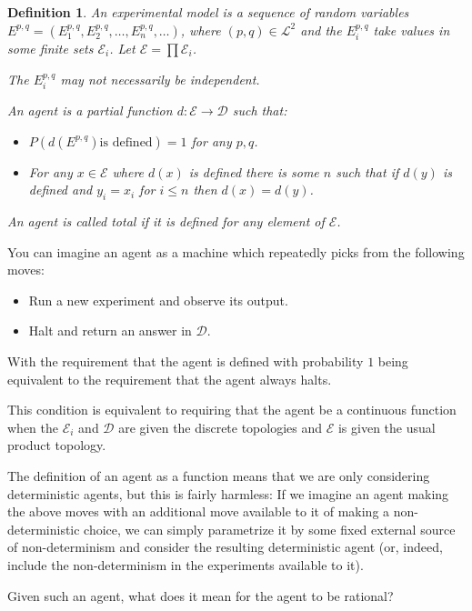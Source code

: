 \documentclass[a4paper]{book}
\newtheorem{definition}{Definition}[section]
\begin{document}
\begin{definition}
An experimental model is a sequence of random variables 
$E^{p, q} = (E^{p, q}_1, E^{p, q}_2, \ldots, E^{p, q}_n, \ldots)$, where
$(p, q) \in \mathcal{L}^2$ and the $E^{p, q}_i$ take values in some finite
sets $\mathcal{E}_i$. Let $\mathcal{E} = \prod \mathcal{E}_i$.

The $E^{p, q}_i$ may not necessarily be independent.

An agent is a partial function
$d: \mathcal{E} \to \mathcal{D}$ such that:

\begin{itemize}
\item $P(d(E^{p, q}) \text{is defined}) = 1$ for any $p, q$.
\item For any $x \in \mathcal{E}$ where $d(x)$ is defined
there is some $n$ such that if $d(y)$ is defined and $y_i = x_i$
for $i \leq n$ then $d(x) = d(y)$.
\end{itemize}

An agent is called total if it is defined for any element of $\mathcal{E}$.
\end{definition}

You can imagine an agent as a machine which repeatedly picks from the
following moves:

\begin{itemize}
\item Run a new experiment and observe its output.
\item Halt and return an answer in $\mathcal{D}$.
\end{itemize}

With the requirement that the agent is defined with probability $1$ being
equivalent to the requirement that the agent always halts.

This condition is equivalent to requiring that the agent be a continuous
function when the $\mathcal{E}_i$
and $\mathcal{D}$
are given the discrete topologies and $\mathcal{E}$
is given the usual product topology.

The definition of an agent as a function means that we are only considering
deterministic agents, but this is fairly harmless: If we imagine an agent
making the above moves with an additional move available to it of making
a non-deterministic choice, we can simply parametrize it by some fixed
external source of non-determinism and consider the resulting deterministic
agent (or, indeed, include the non-determinism in the experiments available
to it).

Given such an agent, what does it mean for the agent to be rational?
\end{document}
